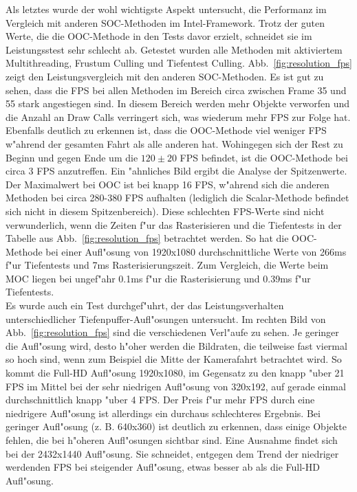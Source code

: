 \documentclass[journal]{vgtc}
\begin{document}
Als letztes wurde der wohl wichtigste Aspekt untersucht, die Performanz im Vergleich mit anderen SOC-Methoden im Intel-Framework.
Trotz der guten Werte, die die OOC-Methode in den Tests davor erzielt, schneidet sie im Leistungsstest sehr schlecht ab.
Getestet wurden alle Methoden mit aktiviertem Multithreading, Frustum Culling und Tiefentest Culling. Abb.\ \ref{fig:resolution_fps} zeigt den Leistungsvergleich mit den anderen SOC-Methoden.
Es ist gut zu sehen, dass die FPS bei allen Methoden im Bereich circa zwischen Frame 35 und 55 stark angestiegen sind.
In diesem Bereich werden mehr Objekte verworfen und die Anzahl an Draw Calls verringert sich, was wiederum mehr FPS zur Folge hat.
Ebenfalls deutlich zu erkennen ist, dass die OOC-Methode viel weniger FPS w"ahrend der gesamten Fahrt als alle anderen hat.
Wohingegen sich der Rest zu Beginn und gegen Ende um die $120\pm20$ FPS befindet, ist die OOC-Methode bei circa 3 FPS anzutreffen.
Ein "ahnliches Bild ergibt die Analyse der Spitzenwerte.
Der Maximalwert bei OOC ist bei knapp 16 FPS, w"ahrend sich die anderen Methoden bei circa 280-380 FPS aufhalten (lediglich die Scalar-Methode befindet sich nicht in diesem Spitzenbereich).
Diese schlechten FPS-Werte sind nicht verwunderlich, wenn die Zeiten f"ur das Rasterisieren und die Tiefentests in der Tabelle aus Abb.\ \ref{fig:resolution_fps} betrachtet werden.
So hat die OOC-Methode bei einer Aufl"osung von 1920x1080 durchschnittliche Werte von 266ms f"ur Tiefentests und 7ms Rasterisierungszeit.
Zum Vergleich, die Werte beim MOC liegen bei ungef"ahr 0.1ms f"ur die Rasterisierung und 0.39ms f"ur Tiefentests.\\

Es wurde auch ein Test durchgef"uhrt, der das Leistungsverhalten unterschiedlicher Tiefenpuffer-Aufl"osungen untersucht.
Im rechten Bild von Abb.\ \ref{fig:resolution_fps} sind die verschiedenen Verl"aufe zu sehen.
Je geringer die Aufl"osung wird, desto h"oher werden die Bildraten, die teilweise fast viermal so hoch sind, wenn zum Beispiel die Mitte der Kamerafahrt betrachtet wird.
So kommt die Full-HD Aufl"osung 1920x1080, im Gegensatz zu den knapp "uber 21 FPS im Mittel bei der sehr niedrigen Aufl"osung von 320x192, auf gerade einmal durchschnittlich knapp "uber 4 FPS. Der Preis f"ur mehr FPS durch eine niedrigere Aufl"osung ist allerdings ein durchaus schlechteres Ergebnis.
Bei geringer Aufl"osung (z. B. 640x360) ist deutlich zu erkennen, dass einige Objekte fehlen, die bei h"oheren Aufl"osungen sichtbar sind.
Eine Ausnahme findet sich bei der 2432x1440 Aufl"osung.
Sie schneidet, entgegen dem Trend der niedriger werdenden FPS bei steigender Aufl"osung, etwas besser ab als die Full-HD Aufl"osung.\\
\end{document}
